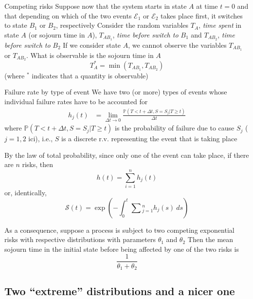 \documentclass[aspectratio=169]{beamer}
\begin{document}

\begin{frame}{Competing risks}
Suppose now that the system starts in state $A$ at time $t=0$ and that depending on which of the two events $\mathcal{E}_1$ or $\mathcal{E}_2$ takes place first, it switches to state $B_1$ or $B_2$, respectively
\vfill
Consider the random variables $T_A$, \emph{time spent} in state $A$ (or sojourn time in $A$), $T_{AB_1}$, \emph{time before switch to} $B_1$ and $T_{AB_2}$, \emph{time before switch to} $B_2$
\vfill
If we consider state $A$, we cannot observe the variables $T_{AB_1}$ or $T_{AB_2}$. What is observable is the sojourn time in $A$
\[
T^*_A=\min\left( T_{AB_1},T_{AB_2} \right)
\]
(where $^*$ indicates that a quantity is observable)
\end{frame}

\begin{frame}{Failure rate by type of event}
We have two (or more) types of events whose individual failure rates have to be accounted for
\begin{align*}
h_j(t) &= \lim_{\Delta t\to 0} \frac{\mathbb{P}( T<t+\Delta t, S=S_j | T\geq t)}{\Delta t} 
\end{align*}
where $\mathbb{P}(T<t+\Delta t, S=S_j | T\geq t)$ is the probability of failure due to cause $S_j$ ($j=1,2$ ici), i.e., $S$ is a discrete r.v. representing the event that is taking place
\end{frame}

\begin{frame}
By the law of total probability, since only one of the event can take place, if there are $n$ risks, then
$$
h(t) = \sum_{i=1}^n h_j(t)
$$
or, identically,
$$
\mathcal{S}(t)
=
\exp\left(
  -\int_0^t \sum\textstyle_{j=1}^n h_j(s)\ ds
\right)
$$
\end{frame}

\begin{frame}
As a consequence, suppose a process is subject to two competing exponential risks with respective distributions with parameters $\theta_1$ and $\theta_2$
\vfill
Then the mean sojourn time in the initial state before being affected by one of the two risks is
$$
\frac{1}{\theta_1+\theta_2}
$$
\end{frame}


\subsection{Two ``extreme'' distributions and a nicer one}
\end{document}
